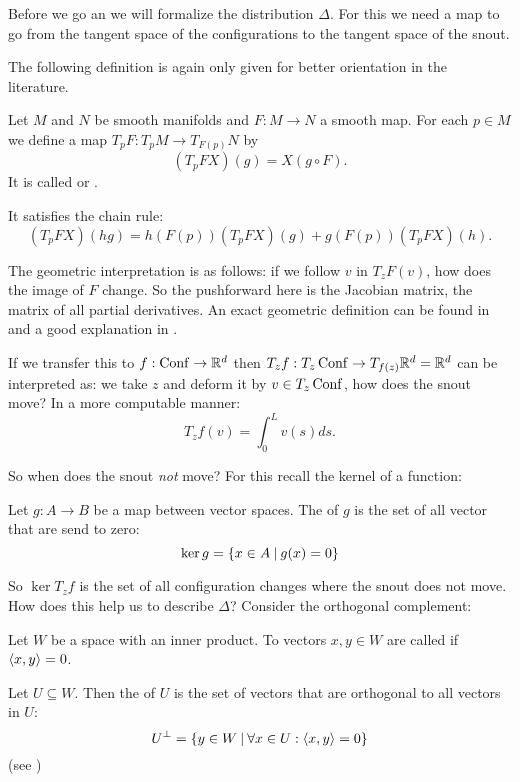Before we go an we will formalize the distribution $\Delta$. For this we
need a map to go from the tangent space of the configurations to
the tangent space of the snout.

The following definition is again only given for better orientation in the literature.
\begin{definition}
    Let $M$ and $N$ be smooth manifolds and $F : M \rightarrow N$ a smooth map.
    For each $p \in M$ we define a map $T_pF : T_pM \rightarrow T_{F(p)}N$ by
        \[ (T_pFX)(g) = X(g \circ F) . \]
    It is called  or .

    It satisfies the chain rule:
        \[ (T_pFX)(hg) = h(F(p))(T_pFX)(g) + g(F(p))(T_pFX)(h) . \]
\end{definition}

The geometric interpretation is as follows: if we follow $v$ in $T_zF(v)$, how
does the image of $F$ change. So the pushforward here is the Jacobian matrix,
the matrix of all partial derivatives. An exact geometric definition can
be found in \cite[Section 5B]{Kuehnel} and a good explanation in \cite[Chapter 3]{JLee}.

If we transfer this to $f : \operatorname{Conf} \rightarrow \mathbb{R}^d$ then
$T_zf : T_z\operatorname{Conf} \rightarrow T_{f(z)}\mathbb{R}^d = \mathbb{R}^d$ can be interpreted as: we take $z$
and deform it by $v \in T_z\operatorname{Conf}$, how does the snout move?
In a more computable manner:
    \[ T_zf(v) = \int_0^L v(s) ds .\]
    
So when does the snout \emph{not} move? For this recall the kernel of a function:
\begin{definition}
    Let $g : A \rightarrow B$ be a map between vector spaces. The 
    of $g$ is the set of all vector that are send to zero:
    \[ \ker g = \left\{{x \in A} \:|\: {g(x) = 0}\right\} \]
\end{definition}

So $\ker T_zf$ is the set of all configuration changes where the snout does not move.
How does this help us to describe $\Delta$? Consider the orthogonal complement:
\begin{definition}
    Let $W$ be a space with an inner product. To vectors $x,y \in W$ are
    called  if $\left\langle{x},{y}\right\rangle = 0$.
    
    Let $U \subseteq W$. Then the  of $U$ is
    the set of vectors that are orthogonal to all vectors in $U$:
    \[U ^{\perp} = \left\{{y \in W} \:|\: {\forall x \in U: \left\langle{x},{y}\right\rangle = 0}\right\} \]
    (see \cite[§62]{Halmos})
\end{definition}

